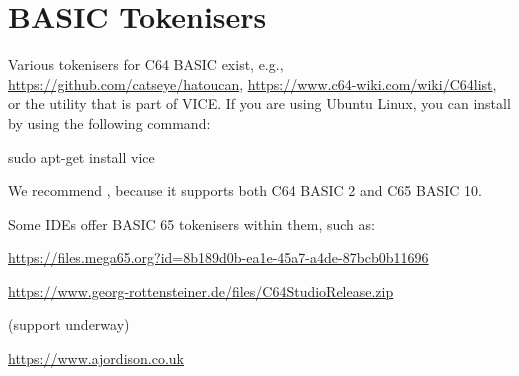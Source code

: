 \chapter{BASIC Tokenisers}

Various tokenisers for C64 BASIC exist, e.g., \url{https://github.com/catseye/hatoucan},
\url{https://www.c64-wiki.com/wiki/C64list}, or the  utility that is part of VICE.
If you are using Ubuntu Linux, you can install  by using the following command:

\begin{screenoutput}
sudo apt-get install vice
\end{screenoutput}

We recommend , because it supports both C64 BASIC 2 and C65 BASIC 10.

Some IDEs offer BASIC 65 tokenisers within them, such as:


\url{https://files.mega65.org?id=8b189d0b-ea1e-45a7-a4de-87bcb0b11696}


\url{https://www.georg-rottensteiner.de/files/C64StudioRelease.zip}

 (support underway)

\url{https://www.ajordison.co.uk}
